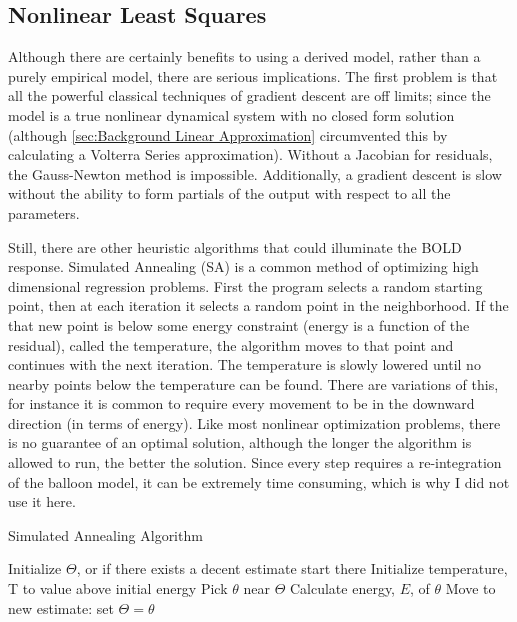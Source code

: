 \subsection{Nonlinear Least Squares}
\label{sec:Nonlinear Least Squares}
Although there are certainly benefits to using a derived model, rather
than a purely empirical model, there are serious implications. The
first problem is that all the powerful classical techniques of gradient
descent are off limits; since the model is a true nonlinear dynamical
system with no closed form solution (although \autoref{sec:Background Linear Approximation}
circumvented this by calculating a Volterra Series approximation). Without
a Jacobian for residuals, the Gauss-Newton method
is impossible. Additionally, a gradient descent is slow
without the ability to form partials of the output with respect
to all the parameters. 

Still, there are other heuristic algorithms
that could illuminate the BOLD response. 
Simulated Annealing (SA) is a common method of optimizing high dimensional
regression problems. First the program selects a random starting point, then
at each iteration it selects a random point in the neighborhood. If the 
that new point is 
below some energy constraint (energy is a function of the residual), 
called the temperature, the algorithm moves
to that point and continues with the next iteration. The temperature
is slowly lowered until no nearby points below the temperature can
be found. There are
variations of this, for instance it is common to require every movement
to be in the downward direction (in terms of energy). Like most nonlinear
optimization problems, there is no guarantee of an optimal solution,
although the longer the algorithm is allowed to run, the better the solution.
Since every step requires a re-integration of the  
balloon model, it can be extremely time consuming, which is why I did 
not use it here.

\begin{algorithm}
\caption{Simulated Annealing Algorithm}
\label{alg:Simulated Annealing}
\begin{algorithmic}
\STATE Initialize $\Theta$, or if there exists a decent estimate start there
\STATE Initialize temperature, T to value above initial energy
    \REPEAT
        \STATE Pick $\theta$ near $\Theta$
        \STATE Calculate energy, $E$, of $\theta$
    \STATE Move to new estimate: set $\Theta = \theta$
\ENDWHILE
\end{algorithmic}
\end{algorithm}

